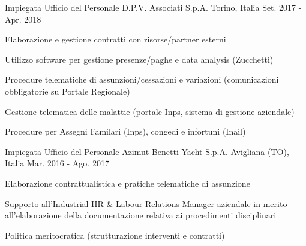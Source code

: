 \begin{cventries}

  \cventry
	{Impiegata Ufficio del Personale} %
	{D.P.V. Associati S.p.A.} %
	{Torino, Italia} %
	{Set. 2017 - Apr. 2018} %
	{
	  \begin{cvitems}
		\item {Elaborazione e gestione contratti con risorse/partner esterni}
		\item {Utilizzo software per gestione presenze/paghe e data analysis (Zucchetti)}
		\item {Procedure telematiche di assunzioni/cessazioni e variazioni (comunicazioni obbligatorie su Portale Regionale)}
		\item {Gestione telematica delle malattie (portale Inps, sistema di gestione aziendale)}
		\item {Procedure per Assegni Familari (Inps), congedi e infortuni (Inail)}
	  \end{cvitems}
	}


%
  \cventry
	{Impiegata Ufficio del Personale} %
	{Azimut Benetti Yacht S.p.A.} %
	{Avigliana (TO), Italia} %
	{Mar. 2016 - Ago. 2017} %
	{
	  \begin{cvitems}
		\item {Elaborazione contrattualistica e pratiche telematiche di assunzione}
		\item {Supporto all'Industrial HR \& Labour Relations Manager aziendale in merito all'elaborazione della documentazione relativa ai procedimenti disciplinari }
		\item {Politica meritocratica (strutturazione interventi e contratti)}
	  \end{cvitems}
	}


\end{cventries}
